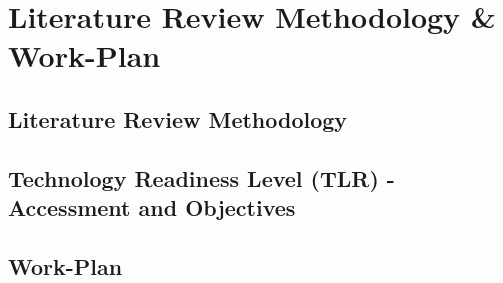 
%

\chapter{Literature Review Methodology \& Work-Plan}
\label{cha:literature_review_methodology_and_workplan}

\section{Literature Review Methodology}
\label{ref:literature_review_methodology}

\section{Technology Readiness Level (TLR) - Accessment and Objectives}
\label{ref:expectations_and_academic_objectives}

\section{Work-Plan}
\label{ref:work_plan}